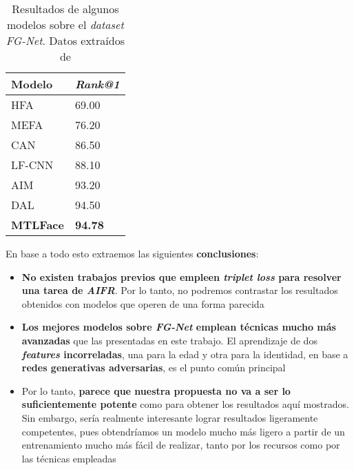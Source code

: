 \begin{table}[H]
\centering
\begin{tabular}{|l|l|}
    \hline
    Modelo & \textit{Rank@1} \\
    \hline
    HFA & 69.00 \\
    MEFA & 76.20 \\
    CAN & 86.50 \\
    LF-CNN & 88.10 \\
    AIM & 93.20 \\
    DAL & 94.50 \\
    \textbf{MTLFace} & \textbf{94.78} \\
    \hline
\end{tabular}
\caption{Resultados de algunos modelos sobre el \textit{dataset} \textit{FG-Net}. Datos extraídos de \cite{informatica:best_fgnet_model}}
\end{table}

En base a todo esto extraemos las siguientes \textbf{conclusiones}:

\begin{itemize}
    \item \textbf{No existen trabajos previos que empleen \textit{triplet loss} para resolver una tarea de \textit{AIFR}}. Por lo tanto, no podremos contrastar los resultados obtenidos con modelos que operen de una forma parecida
    \item \textbf{Los mejores modelos sobre \textit{FG-Net} emplean técnicas mucho más avanzadas} que las presentadas en este trabajo. El aprendizaje de dos \textbf{\textit{features} incorreladas}, una para la edad y otra para la identidad, en base a \textbf{redes generativas adversarias}, es el punto común principal
    \item Por lo tanto, \textbf{parece que nuestra propuesta no va a ser lo suficientemente potente} como para obtener los resultados aquí mostrados. Sin embargo, sería realmente interesante lograr resultados ligeramente competentes, pues obtendríamos un modelo mucho más ligero a partir de un entrenamiento mucho más fácil de realizar, tanto por los recursos como por las técnicas empleadas
\end{itemize}
